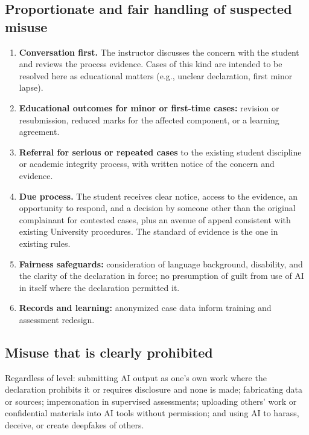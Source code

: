 \subsection{Proportionate and fair handling of suspected misuse}
\begin{enumerate}
  \item \textbf{Conversation first.} The instructor discusses the concern with the student and reviews the process evidence. Cases of this kind are intended to be resolved here as educational matters (e.g., unclear declaration, first minor lapse).
  \item \textbf{Educational outcomes for minor or first-time cases:} revision or resubmission, reduced marks for the affected component, or a learning agreement.
  \item \textbf{Referral for serious or repeated cases} to the existing student discipline or academic integrity process, with written notice of the concern and evidence.
  \item \textbf{Due process.} The student receives clear notice, access to the evidence, an opportunity to respond, and a decision by someone other than the original complainant for contested cases, plus an avenue of appeal consistent with existing University procedures. The standard of evidence is the one in existing \vsu{} rules.
  \item \textbf{Fairness safeguards:} consideration of language background, disability, and the clarity of the declaration in force; no presumption of guilt from use of AI in itself where the declaration permitted it.
  \item \textbf{Records and learning:} anonymized case data inform training and assessment redesign.
\end{enumerate}

\subsection{Misuse that is clearly prohibited}
Regardless of level: submitting AI output as one's own work where the declaration prohibits it or requires disclosure and none is made; fabricating data or sources; impersonation in supervised assessments; uploading others' work or confidential materials into AI tools without permission; and using AI to harass, deceive, or create deepfakes of others.
